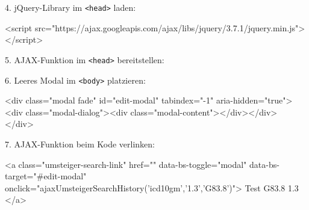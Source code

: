4. jQuery-Library im \texttt{<head>} laden:
\begin{Code}
<script src="https://ajax.googleapis.com/ajax/libs/jquery/3.7.1/jquery.min.js">
</script>
\end{Code}

5. AJAX-Funktion im \texttt{<head>} bereitstellen:

6. Leeres Modal im \texttt{<body>} platzieren:
\begin{Code}
<div class="modal fade" id="edit-modal" tabindex="-1" aria-hidden="true">
  <div class="modal-dialog"><div class="modal-content"></div></div>
</div>
\end{Code}   

7. AJAX-Funktion beim Kode verlinken:
\begin{Code}
<a class="umsteiger-search-link" href="" data-bs-toggle="modal" data-bs-target="#edit-modal"
  onclick="ajaxUmsteigerSearchHistory('icd10gm','1.3','G83.8')">
  Test G83.8 1.3
</a>
\end{Code}   

